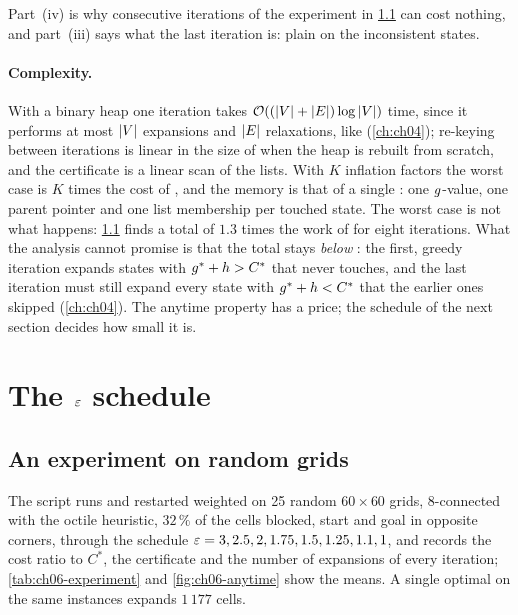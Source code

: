 Part~(iv) is why consecutive iterations of the experiment in
\cref{sec:ch06-experiment} can cost nothing, and part~(iii) says what the last
iteration is: plain \astar on the inconsistent states.

\paragraph{Complexity.}
With a binary heap one iteration takes $\mathcal{O}\!\left((\left\lvert V \right\rvert + \left\lvert E \right\rvert) \log \left\lvert V \right\rvert\right)$
time, since it performs at most $\left\lvert V \right\rvert$ expansions and $\left\lvert E \right\rvert$ relaxations,
like \astar (\cref{ch:ch04}); re-keying \Open between iterations is linear in
the size of \Open when the heap is rebuilt from scratch, and the certificate is
a linear scan of the lists. With $K$ inflation factors the worst case is $K$ times the cost of
\astar, and the memory is that of a single \astar: one $g$-value, one
parent pointer and one list membership per touched state. The worst case is
not what happens: \cref{sec:ch06-experiment} finds a total of $1.3$ times the
work of \astar for eight iterations. What the analysis cannot promise is that
the total stays \emph{below} \astar: the first, greedy iteration expands
states with $g^* + h > C^*$ that \astar never touches, and the last
iteration must still expand every state with $g^* + h < C^*$ that
the earlier ones skipped (\cref{ch:ch04}). The anytime property has a price;
the schedule of the next section decides how small it is.

\section{The \texorpdfstring{$\varepsilon$}{epsilon} schedule}
\label{sec:ch06-schedule}

\subsection{An experiment on random grids}
\label{sec:ch06-experiment}

The script  runs \arastar and restarted weighted
\astar on 25 random $60 \times 60$ grids, 8-connected with the octile
heuristic, $32\,\%$ of the cells blocked, start and goal in opposite corners,
through the schedule $\varepsilon = 3, 2.5, 2, 1.75, 1.5, 1.25, 1.1, 1$, and records
the cost ratio to $C^*$, the certificate and the number of expansions of every
iteration; \cref{tab:ch06-experiment} and \cref{fig:ch06-anytime} show the
means. A single optimal \astar on the same instances expands $1\,177$ cells.

